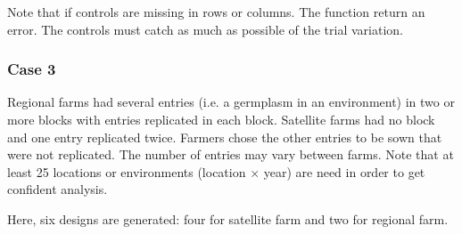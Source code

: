 \documentclass{book}\usepackage[]{graphicx}\usepackage[]{color}
\begin{document}
Note that if controls are missing in rows or columns.
The function return an error.
The controls must catch as much as possible of the trial variation.


\subsubsection{Case 3}

Regional farms had several entries (i.e. a germplasm in an environment) in two or more blocks with entries replicated in each block.
Satellite farms had no block and one entry replicated twice.
Farmers chose the other entries to be sown that were not replicated.
The number of entries may vary between farms.
Note that at least 25 locations or environments (location $\times$ year) are need in order to get confident analysis.


Here, six designs are generated: four for satellite farm and two for regional farm.
\end{document}
